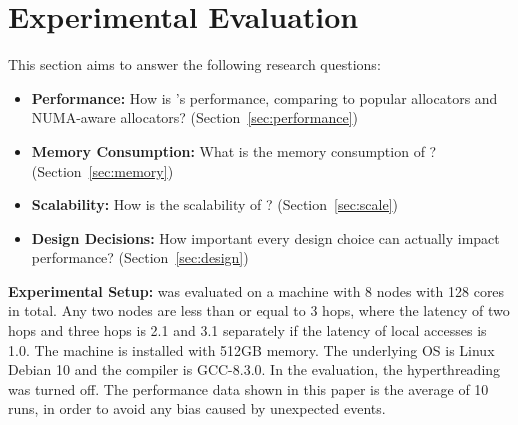 \section{Experimental Evaluation}
\label{sec:evaluation}

This section aims to answer the following research questions: 

\begin{itemize}
\item \textbf{Performance:} How is \NM{}'s performance, comparing to popular allocators and NUMA-aware allocators? (Section~\ref{sec:performance}) 
\item \textbf{Memory Consumption:} What is the memory consumption of \NM{}? (Section~\ref{sec:memory})
\item \textbf{Scalability:} How is the scalability of \NM{}? (Section~\ref{sec:scale})
\item \textbf{Design Decisions:} How important every design choice can actually impact performance? (Section~\ref{sec:design})	
\end{itemize}

\textbf{Experimental Setup:}  \NM{} was evaluated on a machine with 8 nodes with 128 cores in total. Any two nodes are less than or equal to 3 hops, where the latency of two hops and three hops is 2.1 and 3.1 separately if the latency of local accesses is 1.0. The machine is installed with 512GB memory. The underlying OS is Linux Debian 10 and the compiler is GCC-8.3.0. In the evaluation, the hyperthreading was turned off. The performance data shown in this paper is the average of 10 runs, in order to avoid any bias caused by unexpected events.  


